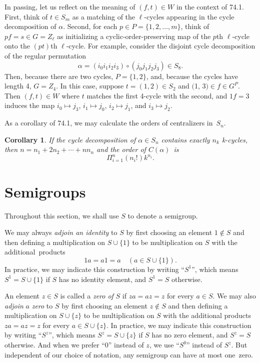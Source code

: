 \documentclass{surv-l}
\numberwithin{equation}{section}
\numberwithin{table}{section}
\numberwithin{figure}{section}
\newtheorem{corollary}[equation]{Corollary}
\theoremstyle{definition}
\begin{document}
In passing, let us reflect on the meaning of $(f, t)\in W$ in
the context of 74.1. First, think of $t\in S_{m}$ as a
matching of the $\ell$-cycles appearing in the cycle
decomposition of $\alpha$. Second, for each $p\in P=\{1,
2,\ldots, m\}$, think of $pf=s\in G=Z_{\ell}$ as initializing
a cyclic-order-preserving map of the $p$th $\ell$-cycle onto
the $(pt)$th $\ell$-cycle. For example, consider the disjoint
cycle decomposition of the regular permutation
\[
\alpha=(i_{0}i_{1}i_{2}i_{3})\circ(j_{0}j_{1}j_{2}j_{3})\in S_{8}.
\]
Then, because there are two cycles, $P=\{1,2\}$, and, because
the cycles have length 4, $G=Z_{4}$. In this case, suppose
$t=(1,2)\in S_{2}$ and $($1, $3)\in f\in G^{P}$. Then
$(f,t)\in W$ where $t$ matches the first 4-cycle with the
second, and $1f=3$ induces the map $i_{0}\mapsto j_{3}$,
$i_{1}\mapsto j_{0}$, $i_{2}\mapsto j_{1}$, and $i_{3}\mapsto
j_{2}$.

As a corollary of 74.1, we may calculate the orders of
centralizers in~$S_{n}$.

\begin{corollary}\label{corA.74.2}
If the cycle decomposition of $\alpha\in S_{n}$ contains
exactly $n_{k}$ k-cycles, then $n=n_{1}+2n_{2}+\cdots+nn_{n}$
and the order of $C(\alpha)$~is
\[
\Pi_{i=1}^{n}(n_{i}!)k^{n_{i}}.
\]
\end{corollary}

\section{Semigroups}\label{secA.75}

Throughout this section, we shall use $S$ to denote a semigroup.

We may always \emph{adjoin an identity}
to $S$ by first choosing an element $1\not\in S$ and then defining
a multiplication on $S\cup\{1\}$ to be multiplication on $S$ with
the additional~products
\[
1a =a1=a\quad (a\in S \cup \{1\}).
\]
In practice, we may indicate this construction by writing
``$S^{1}$'', which means $S^{1}=S\cup\{1\}$ if $S$ has no
identity element, and $S^{1}=S$ otherwise.

An element $z\in S$ is called a \emph{zero of} $S$ if $za=az=z$
for every $a \in S$. We may also \emph{adjoin} $a$
\emph{zero} to $S$ by first choosing an
element $z\not\in S$ and then defining a multiplication on $S\cup
\{z\}$ to be multiplication on $S$ with the additional products
$za=az =z$ for every $a\in S \cup \{z\}$. In practice, we may
indicate this construction by writing ``$S^{z}$'', which means $S^{z}=
S\cup \{z\}$ if $S$ has no zero element, and $S^{z}=S$ otherwise.
And when we prefer ``0'' instead of $z$, we use ``$S^{0}$''
instead of $S^{z}$. But independent of our choice of notation, any
semigroup can have at most one~zero.
\end{document}
